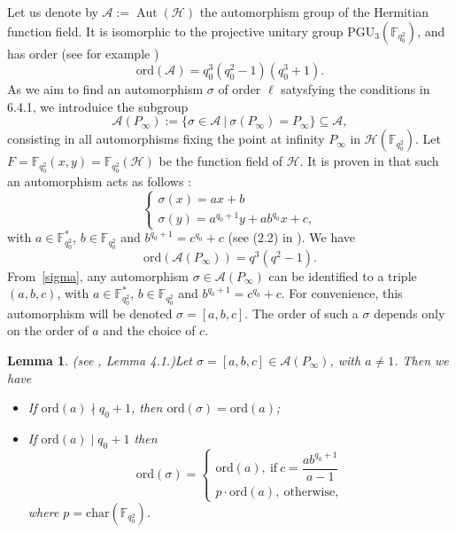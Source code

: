 \documentclass[10pt]{article}
\newtheorem{lem1}[thm]{Lemma}
\theoremstyle{definition}
\theoremstyle{definition}
\theoremstyle{definition}
\newcommand{\s}{\vspace{0.3cm}}
\newcommand{\cd}{\cdot}
\newcommand{\calA}{\mathcal{A}}
\newcommand{\calH}{\mathcal{H}}
\newcommand{\su}{\subseteq}
\newcommand{\Aut}{\operatorname{Aut}}
\begin{document}
Let us denote by $\calA := \Aut(\calH)$ the automorphism group of the Hermitian function field. It is isomorphic to the projective unitary group $\mathrm{PGU}_3(\mathbb{F}_{q_0^2})$, and has order (see for example \cite{Sti})
\[\mathrm{ord}(\calA) =  q_0^3(q_0^2-1)(q_0^3+1).\]
As we aim to find an automorphism $\sigma$ of order $\ell$ satysfying the conditions in 6.4.1, we introduice the subgroup
\[\calA(P_{\infty}) := \{ \sigma \in \calA \ | \ \sigma(P_{\infty}) = P_{\infty}\} \su \calA ,\]
consisting in all automorphisms fixing the point at infinity $P_{\infty}$ in $\calH(\mathbb{F}_{q_0^2})$. Let $F=\mathbb{F}_{q_0^2}(x,y)=\mathbb{F}_{q_0^2}(\calH)$ be the function field of $\calH$. It is proven in \cite{Gar} that such an automorphism acts as follows :
\begin{equation} \label{sigma}
\left\{ \begin{array}{ll}
\sigma(x) = ax+b \\
\sigma(y) = a^{q_0+1}y+ab^{q_0}x+c,
\end{array} \right.
\end{equation}
with $a \in \mathbb{F}_{q_0^2}^*$, $b \in \mathbb{F}_{q_0^2}$ and $b^{q_0+1} = c^{q_0}+c$ (see (2.2) in \cite{Gar}). We have 
\[\mathrm{ord}(\calA(P_{\infty})) = q^3(q^2-1).\]
From~\eqref{sigma}, any automorphism $\sigma \in \calA(P_{\infty})$ can be identified to a triple $(a,b,c)$, with $a \in \mathbb{F}_{q_0^2}^*$, $b \in \mathbb{F}_{q_0^2}$ and $b^{q_0+1} = c^{q_0}+c$. For convenience, this automorphism will be denoted $\sigma = [a,b,c]$. The order of such a $\sigma$ depends only on the order of $a$ and the choice of $c$.

\s

\begin{lem1}(see \cite{Gar}, Lemma 4.1.)\label{ordsigma}
Let $\sigma = [a,b,c] \in \calA(P_{\infty})$, with $a \neq 1$. Then we have
\begin{itemize}
\item[(i)] If $\mathrm{ord}(a) \nmid q_0+1$, then $\mathrm{ord}(\sigma) = \mathrm{ord}(a)$;
\item[(ii)] If $\mathrm{ord}(a) \mid q_0+1$ then
\begin{equation*}
\mathrm{ord}(\sigma) = \left\{\begin{array}{ll}
\mathrm{ord}(a), \ \mathrm{if} \ c=\dfrac{ab^{q_0+1}}{a-1} \\
p \cd \mathrm{ord}(a), \  \mathrm{otherwise}, 
\end{array}
\right.
\end{equation*}
where $p=\mathrm{char}(\mathbb{F}_{q_0^2})$.
\end{itemize}
\end{lem1}
\end{document}
